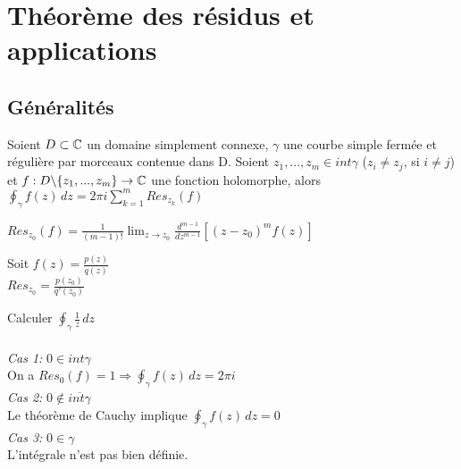 \chapter[Théorème des résidus et applications]{Théorème des résidus et applications}

\section{Généralités}

\begin{myTheorem}
	Soient $D \subset \mathbb{C}$ un domaine simplement connexe, $\gamma$ une courbe simple fermée et régulière par morceaux contenue dans D. Soient $z_{1}, ...,z_{m} \in int \gamma$ ($z_{i}\neq z_{j}$, si $i\neq j$) et $f: D \backslash\{z_{1}, ..., z_{m}\}\rightarrow \mathbb{C}$ une fonction holomorphe, alors
	\\
	$\oint_\gamma f(z)\,dz=2\pi i\sum_{k=1}^{m}Res_{z_{k}}(f)$
\end{myTheorem}

\begin{myProposition}
	$Res_{z_{0}}(f)=\frac{1}{(m-1)!}\lim_{z \rightarrow z_{0}}\frac{d^{m-1}}{dz^{m-1}}[(z-z_{0})^mf(z)]$
\end{myProposition}

\begin{myProposition}
Soit $f(z)=\frac{p(z)}{q(z)}$
\\
$Res_{z_{0}}=\frac{p(z_0)}{q'(z_0)}$
\end{myProposition}

\begin{myExample}
	Calculer $\oint_\gamma \frac{1}{z}\,dz$
	\\\\
	{\it Cas 1:} $0\in int \gamma$
	\\
	On a $Res_{0}(f)=1 \Rightarrow \oint_\gamma f(z)\,dz=2\pi i$
	\\
	{\it Cas 2:} $0\notin \overline{int \gamma}$
	\\
	Le théorème de Cauchy implique $\oint_\gamma f(z)\,dz=0$
	\\
	{\it Cas 3:} $0\in \gamma$
	\\
	L'intégrale n'est pas bien définie.
\end{myExample}

